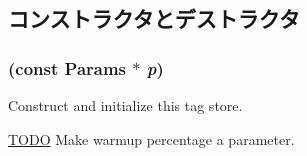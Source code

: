 \subsection{コンストラクタとデストラクタ}
\hypertarget{classLRU_ad9acf3c29ee59e97dd4b0b73d560f382}{
\subsubsection[{LRU}]{ (const {\bf Params} $\ast$ {\em p})}}
\label{classLRU_ad9acf3c29ee59e97dd4b0b73d560f382}
Construct and initialize this tag store. 

\begin{Desc}
\item[\hyperlink{todo__todo000081}{TODO}]Make warmup percentage a parameter. \end{Desc}



